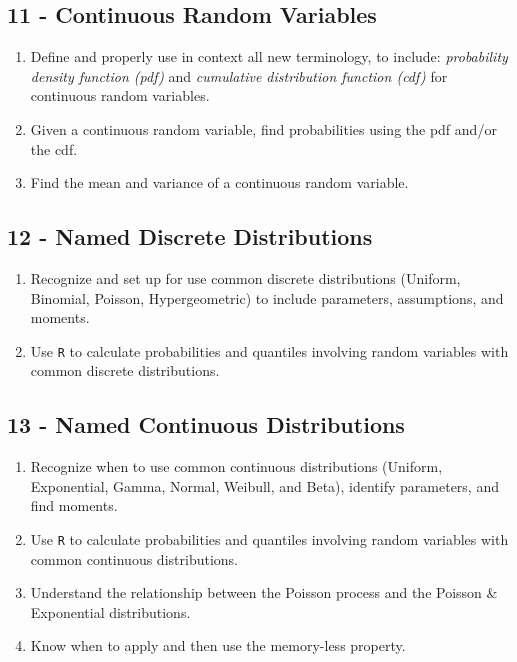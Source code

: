 \documentclass[
  letterpaper,
  DIV=11,
  numbers=noendperiod]{scrreprt}
\begin{document}
\subsection*{11 - Continuous Random
Variables}\label{continuous-random-variables}

\begin{enumerate}
\def\labelenumi{\arabic{enumi})}
\item
  Define and properly use in context all new terminology, to include:
  \emph{probability density function (pdf)} and \emph{cumulative
  distribution function (cdf)} for continuous random variables.
\item
  Given a continuous random variable, find probabilities using the pdf
  and/or the cdf.
\item
  Find the mean and variance of a continuous random variable.
\end{enumerate}

\subsection*{12 - Named Discrete
Distributions}\label{named-discrete-distributions}

\begin{enumerate}
\def\labelenumi{\arabic{enumi})}
\item
  Recognize and set up for use common discrete distributions (Uniform,
  Binomial, Poisson, Hypergeometric) to include parameters, assumptions,
  and moments.
\item
  Use \texttt{R} to calculate probabilities and quantiles involving
  random variables with common discrete distributions.
\end{enumerate}

\subsection*{13 - Named Continuous
Distributions}\label{named-continuous-distributions}

\begin{enumerate}
\def\labelenumi{\arabic{enumi})}
\item
  Recognize when to use common continuous distributions (Uniform,
  Exponential, Gamma, Normal, Weibull, and Beta), identify parameters,
  and find moments.
\item
  Use \texttt{R} to calculate probabilities and quantiles involving
  random variables with common continuous distributions.
\item
  Understand the relationship between the Poisson process and the
  Poisson \& Exponential distributions.
\item
  Know when to apply and then use the memory-less property.
\end{enumerate}
\end{document}
